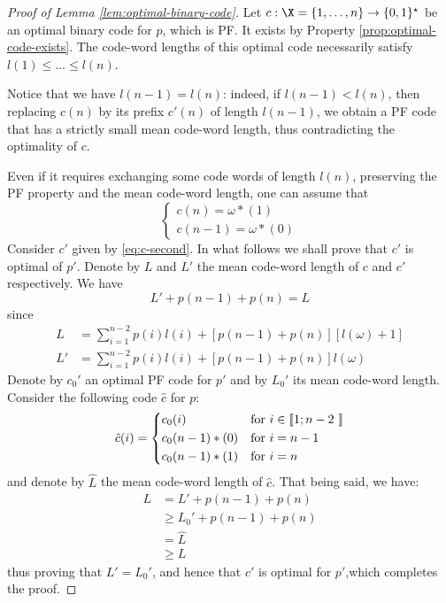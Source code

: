 \documentclass[toc, titlepaged]{../cs-classes/cs-classes}
\begin{document}
\begin{proof}[Proof of Lemma \ref{lem:optimal-binary-code}]
    Let $c:\X=\{1, \dots, n\}\to\{0, 1\}^\star$ be an optimal binary code for $p$, which is PF. It exists by Property \ref{prop:optimal-code-exists}. The code-word lengths of this optimal code necessarily satisfy $l(1)\leq\dots\leq l(n)$.

    Notice that we have $l(n-1) = l(n)$: indeed, if $l(n-1)<l(n)$, then replacing $c(n)$ by its prefix $c'(n)$ of length $l(n-1)$, we obtain a PF code that has a strictly small mean code-word length, thus contradicting the optimality of $c$.

    Even if it requires exchanging some code words of length $l(n)$, preserving the PF property and the mean code-word length, one can assume that
    \begin{equation*}
        \begin{cases*}
            c(n) = \omega * (1)\\
            c(n-1) = \omega * (0)
        \end{cases*}
    \end{equation*}
    Consider $c'$ given by \eqref{eq:c-second}. In what follows we shall prove that $c'$ is optimal of $p'$. Denote by $L$ and $L'$ the mean code-word length of $c$ and $c'$ respectively. We have
    \begin{equation*}
        L' + p(n-1) + p(n) = L
    \end{equation*}
    since
    \begin{equation*}
        \begin{aligned}
            L &= \sum_{i=1}^{n-2} p(i)l(i) + [p(n-1)+p(n)][l(\omega)+1]\\
            L' &= \sum_{i=1}^{n-2} p(i)l(i) + [p(n-1)+p(n)] l(\omega)
        \end{aligned}
    \end{equation*}
    Denote by $c_0'$ an optimal PF code for $p'$ and by $L_0'$ its mean code-word length. Consider the following code $\hat{c}$ for $p$:
    \begin{equation*}
        \hat{c}(i) = \begin{cases*}
            c_0(i) & for $i\in\llbracket 1; n-2 \rrbracket$\\
            c_0(n-1) * (0) & for $i=n-1$\\
            c_0(n-1) * (1) & for $i=n$\\
        \end{cases*}
    \end{equation*}
    and denote by $\hat{L}$ the mean code-word length of $\hat{c}$. That being said, we have:
    \begin{equation*}
        \begin{aligned}
            L &= L' + p(n-1) + p(n)\\
            &\geq L_0' + p(n-1) + p(n)\\
            &= \hat{L}\\
            &\geq L
        \end{aligned}
    \end{equation*}
    thus proving that $L'=L_0'$, and hence that $c'$ is optimal for $p'$,which completes the proof.
\end{proof}
\end{document}

